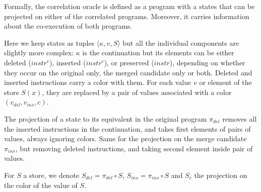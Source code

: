 \documentclass[a4paper,11pt]{article}
\begin{document}
Formally, the correlation oracle is defined as a program with a states that can be projected on either of the correlated programs. Moreover, it carries information about the co-execution of both programs.

Here we keep states as tuples $\langle\kappa, v, S\rangle$ but all the individual components are slightly more complex: $\kappa$ is the continuation but its elements can be either deleted (\st{$instr$}$^c$), inserted (\ul{$instr$}$^c$), or preserved ($instr$), depending on whether they occur on the original only, the merged candidate only or both. Deleted and inserted instructions carry a color with them. For each value $v$ or element of the store $S(x)$, they are replaced by a pair of values associated with a color $(v_{del}, v_{ins}, c)$.

The projection of a state to its equivalent in the original program $\pi_{del}$ removes all the inserted instructions in the continuation, and takes first elements of pairs of values, always ignoring colors. Same for the projection on the merge candidate $\pi_{ins}$, but removing deleted instructions, and taking second element inside pair of values.

For $S$ a store, we denote $S_{del} = \pi_{del} \circ S$, $S_{ins} = \pi_{ins} \circ S$ and $S_{c}$ the projection on the color of the value of $S$.
\end{document}
